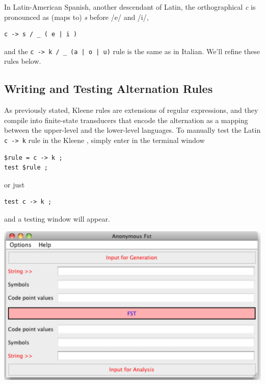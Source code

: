 In Latin-American Spanish, another descendant of Latin, the orthographical
\emph{c} is pronounced as (maps to) \emph{s} before /e/ and /i/, 

\begin{Verbatim}
c -> s / _ ( e | i )
\end{Verbatim}

\noindent
and the \verb!c -> k / _ (a | o | u)! rule is the same as in Italian.  We'll refine these rules below.

\subsection{Writing and Testing Alternation Rules}

As previously stated, Kleene rules are extensions of 
regular expressions, and they compile into finite-state
transducers that encode the alternation as a mapping between the
upper-level and the lower-level languages.  To manually test the Latin \texttt{c -> k} rule in the Kleene , simply
enter in the terminal window

\begin{Verbatim}
$rule = c -> k ;
test $rule ;
\end{Verbatim}

\noindent
or just


\begin{Verbatim}
test c -> k ;
\end{Verbatim}


\noindent
and a testing window will appear.

\vspace{0.3cm}

\begin{center}
\includegraphics[width=\textwidth]{images/testWindow.pdf}
\end{center}

